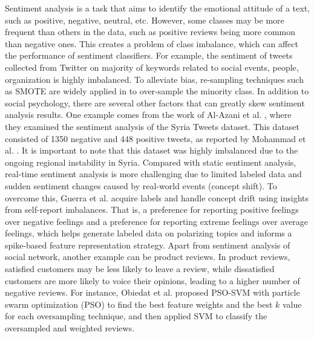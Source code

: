 Sentiment analysis is a task that aims to identify the emotional attitude of a text, such as positive, negative, neutral, etc. However, some classes may be more frequent than others in the data, such as positive reviews being more common than negative ones. This creates a problem of class imbalance, which can affect the performance of sentiment classifiers.
For example, the sentiment of tweets collected from Twitter on majority of keywords related to social events, people, organization is highly imbalanced. To alleviate bias, 
re-sampling techniques such as SMOTE are widely applied in \cite{ghosh2019imbalanced,flores2018evaluation,ardianto2020sentiment} to over-sample the minority class. 
In addition to social psychology, there are several other factors that can greatly skew sentiment analysis results. One example comes from the work of Al-Azani et al. \cite{al2017using}, where they examined the sentiment analysis of the Syria Tweets dataset. This dataset consisted of 1350 negative and 448 positive tweets, as reported by Mohammad et al. \cite{mohammad2016translation}. It is important to note that this dataset was highly imbalanced due to the ongoing regional instability in Syria.
Compared with static sentiment analysis, real-time sentiment analysis is more challenging due to limited labeled data and sudden sentiment changes caused by real-world events (concept shift). To overcome this, Guerra et al. \cite{guerra2014sentiment} acquire labels and handle concept drift using insights from self-report imbalances. That is, a preference for reporting positive feelings over negative feelings and a preference for reporting extreme feelings over average feelings, which helps generate labeled data on polarizing topics and informs a spike-based feature representation strategy. 
Apart from sentiment analysis of social network, another example can be product reviews. In product reviews, satisfied customers may be less likely to leave a review, while dissatisfied customers are more likely to voice their opinions, leading to a higher number of negative reviews. For instance, Obiedat et al. \cite{obiedat2022sentiment} proposed PSO-SVM with particle swarm optimization (PSO) to find the best feature weights and the best $k$ value for each oversampling technique, and then applied SVM to classify the oversampled and weighted reviews.

